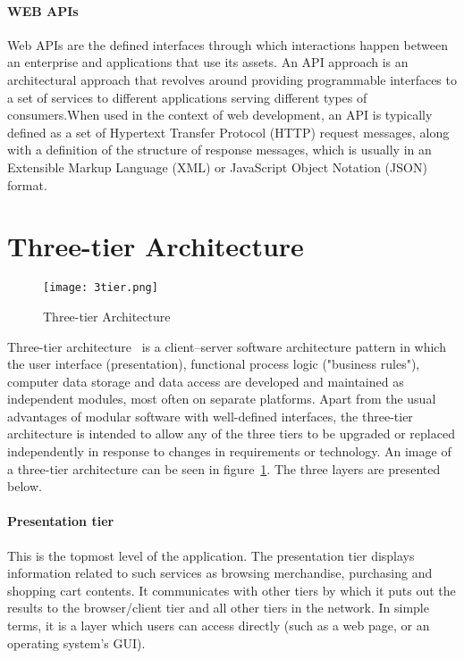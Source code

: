 \paragraph{WEB APIs}
Web APIs are the defined interfaces through which interactions happen between an enterprise and applications that use its assets. An API approach is an architectural approach that revolves around providing programmable interfaces to a set of services to different applications serving different types of consumers.When used in the context of web development, an API is typically defined as a set of Hypertext Transfer Protocol (HTTP) request messages, along with a definition of the structure of response messages, which is usually in an Extensible Markup Language (XML) or JavaScript Object Notation (JSON) format.

\section{Three-tier Architecture}
\label{3tierarch}
\begin{figure}
	\centerline{\texttt{[image: 3tier.png]}}
	\caption{Three-tier Architecture}
	\label{3tier}
\end{figure}

Three-tier architecture~\cite{ramirez2000three} is a client–server software architecture pattern in which the user interface (presentation), functional process logic ("business rules"), computer data storage and data access are developed and maintained as independent modules, most often on separate platforms. Apart from the usual advantages of modular software with well-defined interfaces, the three-tier architecture is intended to allow any of the three tiers to be upgraded or replaced independently in response to changes in requirements or technology. An image of a three-tier architecture can be seen in figure~\ref{3tier}. The three layers are presented below.

\paragraph{Presentation tier}
This is the topmost level of the application. The presentation tier displays information related to such services as browsing merchandise, purchasing and shopping cart contents. It communicates with other tiers by which it puts out the results to the browser/client tier and all other tiers in the network. In simple terms, it is a layer which users can access directly (such as a web page, or an operating system's GUI).

